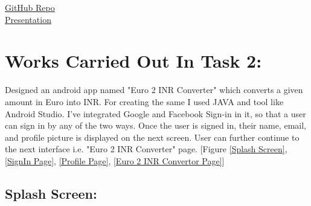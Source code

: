 \documentclass[12pt]{article}
\begin{document}
\href{https://github.com/rishavpandey160999/Saving-Paws-Website}{GitHub Repo}\\

\href{https://youtu.be/sJ11fdcWGwQ}{Presentation}
\clearpage

\section{Works Carried Out In Task 2:}
Designed an android app named "Euro 2 INR Converter" which converts a given amount in Euro into INR. For creating the same I used JAVA and tool like Android Studio. I've integrated Google and Facebook Sign-in in it, so that a user can sign in by any of the two ways. Once the user is signed in, their name, email, and profile picture is displayed on the next screen. User can further continue to the next interface i.e. "Euro 2 INR Converter" page. [Figure \ref{Splash Screen}, \ref{SignIn Page}, \ref{Profile Page}, \ref{Euro 2 INR Convertor Page}]

\subsection{Splash Screen:}
\end{document}
